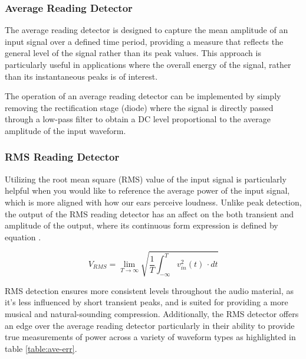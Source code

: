\documentclass[10pt]{article}
\begin{document}
\begin{multicols*}{2}
                \subsubsection{Average Reading Detector}
                    The average reading detector is designed to capture the mean amplitude of an input signal over a defined time period, providing a measure that reflects the general level of the signal rather than its peak values. This approach is particularly useful in applications where the overall energy of the signal, rather than its instantaneous peaks is of interest.\par
                    The operation of an average reading detector can be implemented by simply removing the rectification stage (diode) where the signal is directly passed through a low-pass filter to obtain a DC level proportional to the average amplitude of the input waveform. 
                

                    

                \subsubsection{RMS Reading Detector}
                    Utilizing the root mean square (RMS) value of the input signal is particularly helpful when you would like to reference the average power of the input signal, which is more aligned with how our ears perceive loudness. Unlike peak detection, the output of the RMS reading detector has an affect on the both transient and amplitude of the output, where its continuous form expression is defined by equation \cite{aes-that-rms}.
                    
                        \begin{equation}
                            V_{RMS} = \lim_{T \to \infty}\sqrt{\frac{1}{T}\int_{-\infty}^{T} v_{in}^2(t) \,\cdot dt}
                        \end{equation}
                    
                    \noindent RMS detection ensures more consistent levels throughout the audio material, as it's less influenced by short transient peaks, and is suited for providing a more musical and natural-sounding compression. Additionally, the RMS detector offers an edge over the average reading detector particularly in their ability to provide true measurements of power across a variety of waveform types as highlighted in table \ref{table:ave-err}.   


\end{multicols*}
\end{document}
